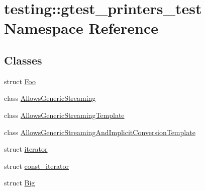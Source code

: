 \hypertarget{namespacetesting_1_1gtest__printers__test}{\section{testing\-:\-:gtest\-\_\-printers\-\_\-test \-Namespace \-Reference}
\label{dd/d01/namespacetesting_1_1gtest__printers__test}
}
\subsection*{\-Classes}
\begin{DoxyCompactItemize}
\item 
struct \hyperlink{structtesting_1_1gtest__printers__test_1_1Foo}{\-Foo}
\item 
class \hyperlink{classtesting_1_1gtest__printers__test_1_1AllowsGenericStreaming}{\-Allows\-Generic\-Streaming}
\item 
class \hyperlink{classtesting_1_1gtest__printers__test_1_1AllowsGenericStreamingTemplate}{\-Allows\-Generic\-Streaming\-Template}
\item 
class \hyperlink{classtesting_1_1gtest__printers__test_1_1AllowsGenericStreamingAndImplicitConversionTemplate}{\-Allows\-Generic\-Streaming\-And\-Implicit\-Conversion\-Template}
\item 
struct \hyperlink{structtesting_1_1gtest__printers__test_1_1iterator}{iterator}
\item 
struct \hyperlink{structtesting_1_1gtest__printers__test_1_1const__iterator}{const\-\_\-iterator}
\item 
struct \hyperlink{structtesting_1_1gtest__printers__test_1_1Big}{\-Big}
\end{DoxyCompactItemize}

